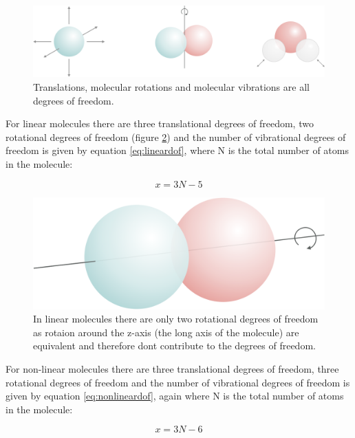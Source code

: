\documentclass[
]{book}
\begin{document}
\begin{figure}

{\centering \includegraphics[width=0.8\linewidth]{images/typesdegree} 

}

\caption{Translations, molecular rotations and molecular vibrations are all degrees of freedom.}\label{fig:typesdegree}
\end{figure}

For linear molecules there are three translational degrees of freedom, two rotational degrees of freedom (figure \ref{fig:linear}) and the number of vibrational degrees of freedom is given by equation \eqref{eq:lineardof}, where N is the total number of atoms in the molecule:

\begin{equation}
x = 3N-5
\label{eq:lineardof}
\end{equation}

\begin{figure}

{\centering \includegraphics[width=0.8\linewidth]{images/linear} 

}

\caption{In linear molecules there are only two rotational degrees of freedom as rotaion around the z-axis (the long axis of the molecule) are equivalent and therefore dont contribute to the degrees of freedom.}\label{fig:linear}
\end{figure}

For non-linear molecules there are three translational degrees of freedom, three rotational degrees of freedom and the number of vibrational degrees of freedom is given by equation \eqref{eq:nonlineardof}, again where N is the total number of atoms in the molecule:

\begin{equation}
x = 3N-6
\label{eq:nonlineardof}
\end{equation}
\end{document}
